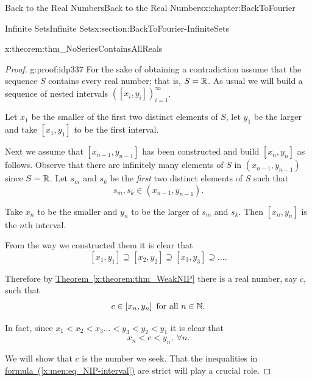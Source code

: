 \begin{chapterptx}{Back to the Real Numbers}{}{Back to the Real Numbers}{}{}{x:chapter:BackToFourier}
\begin{sectionptx}{Infinite Sets}{}{Infinite Sets}{}{}{x:section:BackToFourier-InfiniteSets}
\begin{theorem}{}{}{x:theorem:thm_NoSeriesContainsAllReals}
		\end{theorem}
		\begin{proof}{}{g:proof:idp337}
			For the sake of obtaining a contradiction assume that the sequence \(S\) contains every real number; that is, \(S=\mathbb {R}\). As usual we will build a sequence of nested intervals \(\left(\left[x_i, y_i\right]\right)_{i=1}^\infty\).%
			\par
			Let \(x_1\) be the smaller of the first two distinct elements of \(S\), let \(y_1\) be the larger and take \(\left[x_1,y_1\right]\) to be the first interval.%
			\par
			Next we assume that \(\left[x_{n-1}, y_{n-1}\right]\) has been constructed and build \(\left[x_n, y_n\right]\) as follows. Observe that there are infinitely many elements of \(S\) in \(\left(x_{n-1}, y_{n-1}\right)\) since \(S=\mathbb {R}\). Let \(s_m\) and \(s_k\) be the \emph{first} two distinct elements of \(S\) such that%
			\begin{equation*}
				s_m, s_k \in \left(x_{n-1}, y_{n-1}\right) \text{.}
			\end{equation*}
			\par
			Take \(x_n\) to be the smaller and \(y_n\) to be the larger of \(s_m\) and \(s_k\). Then \(\left[x_n, y_n\right]\) is the \(n\)th interval.%
			\par
			From the way we constructed them it is clear that%
			\begin{equation*}
				\left[x_1, y_1\right] \supseteq \left[x_2, y_2\right] \supseteq \left[x_3, y_3\right] \supseteq \ldots\text{.}
			\end{equation*}
			\par
			Therefore by \hyperref[x:theorem:thm_WeakNIP]{Theorem~{\xreffont\ref{x:theorem:thm_WeakNIP}}} there is a real number, say \(c\), such that%
			\begin{equation*}
				c\in\left[x_n, y_n\right] \text{ for all }  n\in\mathbb {N}\text{.}
			\end{equation*}
			\par
			In fact, since \(x_1\lt x_2\lt x_3\ldots\lt y_3\lt y_2\lt y_1\) it is clear that%
			\begin{equation}
				x_n\lt c\lt y_n, \ \forall n\text{.}\label{x:men:eq_NIP-interval}
			\end{equation}
			\par
			We will show that \(c\) is the number we seek. That the inequalities in \hyperref[x:men:eq_NIP-interval]{formula~({\xreffont\ref{x:men:eq_NIP-interval}})} are strict will play a crucial role.%

\end{proof}
\end{sectionptx}
\end{chapterptx}
